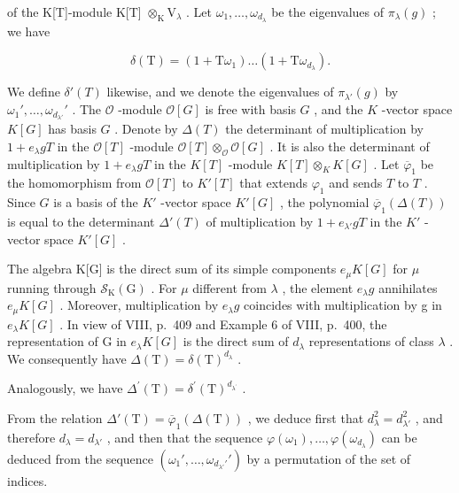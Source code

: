 of the K{[}T{]}-module K{[}T{]} \(\otimes_{\mathrm{K}}\mathrm{V}_{\lambda}\) . Let \(\omega_{1},\ldots ,\omega_{d_{\lambda}}\) be the eigenvalues of \(\pi_{\lambda}(g)\) ; we have

\[
\delta (\mathrm{T}) = (1 + \mathrm{T} \omega_ {1}) \dots (1 + \mathrm{T} \omega_ {d _ {\lambda}}).
\]

We define \(\delta'(T)\) likewise, and we denote the eigenvalues of \(\pi_{\lambda'}(g)\) by \(\omega_1', \ldots, \omega_{d_{\lambda'}}'\) . The \(\mathcal{O}\) -module \(\mathcal{O}[G]\) is free with basis \(G\) , and the \(K\) -vector space \(K[G]\) has basis \(G\) . Denote by \(\Delta(T)\) the determinant of multiplication by \(1 + e_{\lambda}gT\) in the \(\mathcal{O}[T]\) -module \(\mathcal{O}[T] \otimes_{\mathcal{O}} \mathcal{O}[G]\) . It is also the determinant of multiplication by \(1 + e_{\lambda}gT\) in the \(K[T]\) -module \(K[T] \otimes_K K[G]\) . Let \(\overline{\varphi}_1\) be the homomorphism from \(\mathcal{O}[T]\) to \(K'[T]\) that extends \(\varphi_1\) and sends \(T\) to \(T\) . Since \(G\) is a basis of the \(K'\) -vector space \(K'[G]\) , the polynomial \(\overline{\varphi}_1(\Delta(T))\) is equal to the determinant \(\Delta'(T)\) of multiplication by \(1 + e_{\lambda'}gT\) in the \(K'\) -vector space \(K'[G]\) .

The algebra K{[}G{]} is the direct sum of its simple components \(e_{\mu}K[G]\) for \(\mu\) running through \(\mathcal{S}_{\mathrm{K}}(\mathrm{G})\) . For \(\mu\) different from \(\lambda\) , the element \(e_{\lambda}g\) annihilates \(e_{\mu}K[G]\) . Moreover, multiplication by \(e_{\lambda}g\) coincides with multiplication by g in \(e_{\lambda}K[G]\) . In view of VIII, p.~409 and Example 6 of VIII, p.~400, the representation of G in \(e_{\lambda}K[G]\) is the direct sum of \(d_{\lambda}\) representations of class \(\lambda\) . We consequently have \(\Delta(\mathrm{T}) = \delta(\mathrm{T})^{d_{\lambda}}\) .

Analogously, we have \(\Delta^{\prime}(\mathrm{T}) = \delta^{\prime}(\mathrm{T})^{d_{\lambda^{\prime}}}\) .

From the relation \(\Delta'(\mathrm{T}) = \overline{\varphi}_1(\Delta(\mathrm{T}))\) , we deduce first that \(d_{\lambda}^2 = d_{\lambda'}^2\) , and therefore \(d_{\lambda} = d_{\lambda'}\) , and then that the sequence \(\varphi(\omega_1), \ldots, \varphi(\omega_{d_\lambda})\) can be deduced from the sequence \((\omega_1', \ldots, \omega_{d_{\lambda'}'}')\) by a permutation of the set of indices.

